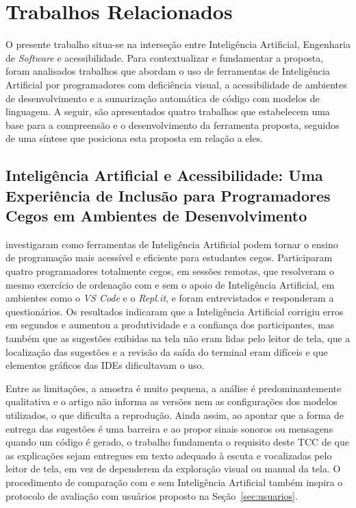 \documentclass[
    12pt,                   %
    openright,              %
    oneside,                %
    a4paper,                %
    sumario=tradicional,    %
    english,                %
    brazil,                 %
    ]{abntex2}
\begin{document}
\chapter{Trabalhos Relacionados}\label{sec:TrabRel}

O presente trabalho situa-se na interseção entre Inteligência Artificial, Engenharia de \textit{Software} e acessibilidade. Para contextualizar e fundamentar a proposta, foram analisados trabalhos que abordam o uso de ferramentas de Inteligência Artificial por programadores com deficiência visual, a acessibilidade de ambientes de desenvolvimento e a sumarização automática de código com modelos de linguagem. A seguir, são apresentados quatro trabalhos que estabelecem uma base para a compreensão e o desenvolvimento da ferramenta proposta, seguidos de uma síntese que posiciona esta proposta em relação a eles.

\section{Inteligência Artificial e Acessibilidade: Uma Experiência de Inclusão para Programadores Cegos em Ambientes de Desenvolvimento}

\textcite{latinoware34224} investigaram como ferramentas de Inteligência Artificial podem tornar o ensino de programação mais acessível e eficiente para estudantes cegos. Participaram quatro programadores totalmente cegos, em sessões remotas, que resolveram o mesmo exercício de ordenação com e sem o apoio de Inteligência Artificial, em ambientes como o \textit{VS Code} e o \textit{Repl.it}, e foram entrevistados e responderam a questionários. Os resultados indicaram que a Inteligência Artificial corrigiu erros em segundos e aumentou a produtividade e a confiança dos participantes, mas também que as sugestões exibidas na tela não eram lidas pelo leitor de tela, que a localização das sugestões e a revisão da saída do terminal eram difíceis e que elementos gráficos das IDEs dificultavam o uso.

Entre as limitações, a amostra é muito pequena, a análise é predominantemente qualitativa e o artigo não informa as versões nem as configurações dos modelos utilizados, o que dificulta a reprodução. Ainda assim, ao apontar que a forma de entrega das sugestões é uma barreira e ao propor sinais sonoros ou mensagens quando um código é gerado, o trabalho fundamenta o requisito deste TCC de que as explicações sejam entregues em texto adequado à escuta e vocalizadas pelo leitor de tela, em vez de dependerem da exploração visual ou manual da tela. O procedimento de comparação com e sem Inteligência Artificial também inspira o protocolo de avaliação com usuários proposto na Seção~\ref{sec:usuarios}.
\end{document}

